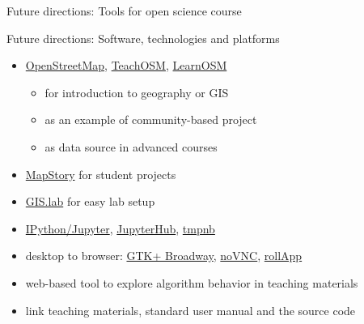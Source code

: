 \documentclass[xcolor={dvipsnames,usenames},beamer]{beamer}
\begin{document}
\begin{frame}{Future directions: Tools for open science course}
\begin{overlayarea}{\textwidth}{\textheight}
\begin{itemize}
{\begin{itemize}
\end{itemize}
}
\end{itemize}


\end{overlayarea}

\end{frame}


\begin{frame}{Future directions: Software, technologies and platforms}

\begin{itemize}
 \item \href{http://openstreetmap.org/}{OpenStreetMap},
    \href{http://teachosm.org}{TeachOSM}, \href{http://learnosm.org}{LearnOSM}
 \begin{itemize}
  \item for introduction to geography or GIS
  \item as an example of community-based project
  \item as data source in advanced courses
 \end{itemize}
 \item \href{http://mapstory.org/}{MapStory} {\scriptsize for student projects}
 \item \href{http://imincik.github.io/gis-lab/}{GIS.lab} {\scriptsize for easy lab setup}
 \item \href{http://jupyter.org/}{IPython/Jupyter},
    \href{https://github.com/jupyter/jupyterhub}{JupyterHub},
    \href{https://github.com/jupyter/tmpnb}{tmpnb}
 \item
    desktop to browser:
    \href{https://developer.gnome.org/gtk3/stable/gtk-broadway.html}{GTK+ Broadway},
    \href{https://kanaka.github.io/noVNC/}{noVNC},
    \href{https://www.rollapp.com/}{rollApp}
 \item web-based tool to explore algorithm behavior in teaching materials
 \item link teaching materials, standard user manual and the source code
\end{itemize}

\end{frame}
\end{document}
